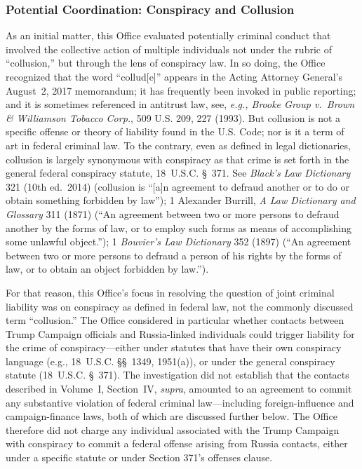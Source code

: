 \subsubsection{Potential Coordination: Conspiracy and Collusion}
As an initial matter, this Office evaluated potentially criminal conduct that involved the collective action of multiple individuals not under the rubric of ``collusion,'' but through the lens of conspiracy law.
In so doing, the Office recognized that the word ``collud[e]'' appears in the Acting Attorney General's August~2, 2017 memorandum; it has frequently been invoked in public reporting; and it is sometimes referenced in antitrust law, see, \textit{e.g., Brooke Group v.\ Brown \& Williamson Tobacco Corp.}, 509 U.S. 209, 227 (1993).
But collusion is not a specific offense or theory of liability found in the U.S. Code; nor is it a term of art in federal criminal law.
To the contrary, even as defined in legal dictionaries, collusion is largely synonymous with conspiracy as that crime is set forth in the general federal conspiracy statute, 18~U.S.C. \S~371.
See \textit{Black's Law Dictionary} 321 (10th ed.~2014) (collusion is ``[a]n agreement to defraud another or to do or obtain something forbidden by law''); 1 Alexander Burrill, \textit{A Law Dictionary and Glossary} 311 (1871) (``An agreement between two or more persons to defraud another by the forms of law, or to employ such forms as means of accomplishing some unlawful object.''); 1 \textit{Bouvier's Law Dictionary} 352 (1897) (``An agreement between two or more persons to defraud a person of his rights by the forms of law, or to obtain an object forbidden by law.'').

For that reason, this Office's focus in resolving the question of joint criminal liability was on conspiracy as defined in federal law, not the commonly discussed term ``collusion.''
The Office considered in particular whether contacts between Trump Campaign officials and Russia-linked individuals could trigger liability for the crime of conspiracy---either under statutes that have their own conspiracy language (e.g., 18~U.S.C. \S\S~1349, 1951(a)), or under the general conspiracy statute (18~U.S.C. \S~371).
The investigation did not establish that the contacts described in Volume~I, Section~IV, \textit{supra}, amounted to an agreement to commit any substantive violation of federal criminal law---including foreign-influence and campaign-finance laws, both of which are discussed further below.
The Office therefore did not charge any individual associated with the Trump Campaign with conspiracy to commit a federal offense arising from Russia contacts, either under a specific statute or under Section 371's offenses clause.

